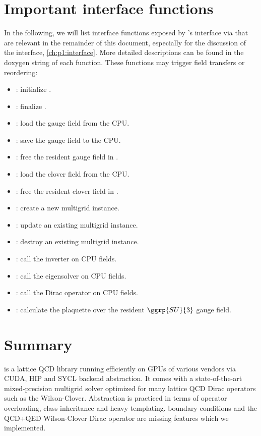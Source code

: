 \section{Important interface functions}

In the following, we will list interface functions exposed by \quda's interface via  that are relevant in the remainder of this document, especially for the discussion of the interface, \cref{ch:p1:interface}.
More detailed descriptions can be found in the doxygen string of each function.
These functions may trigger field transfers or reordering:

\begin{itemize}
  \item {}: initialize \quda.
  \item {}: finalize \quda.
  \item {}: load the gauge field from the CPU.
  \item {}: save the gauge field to the CPU.
  \item {}: free the resident gauge field in \quda.
  \item {}: load the clover field from the CPU.
  \item {}: free the resident clover field in \quda.
  \item {}: create a new multigrid instance.
  \item {}: update an existing multigrid instance.
  \item {}: destroy an existing multigrid instance.
  \item {}: call the inverter on CPU fields.
  \item {}: call the eigensolver on CPU fields.
  \item {}: call the Dirac operator on CPU fields.
  \item {}: calculate the plaquette over the resident $\ggrp{SU}{3}$ gauge field.
\end{itemize} 

\section{Summary}


\Quda is a lattice QCD library running efficiently on GPUs of various vendors via CUDA, HIP and SYCL backend abstraction.
It comes with a state-of-the-art mixed-precision multigrid solver optimized for many lattice QCD Dirac operators such as the Wilson-Clover.
Abstraction is practiced in terms of operator overloading, class inheritance and heavy templating.
\Cstar boundary conditions and the QCD+QED Wilson-Clover Dirac operator are missing features which we implemented.
